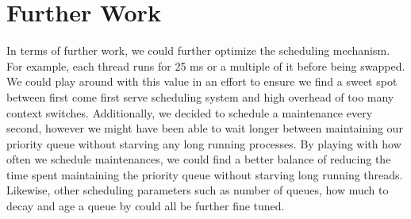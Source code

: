 \documentclass{article}
\begin{document}
\section{Further Work}
In terms of further work, we could further optimize the scheduling mechanism. For example, each thread runs for 25 ms or a multiple of it before being swapped. We could play around with this value in an effort to ensure we find a sweet spot between first come first serve scheduling system and high overhead of too many context switches. Additionally, we decided to schedule a maintenance every second, however we might have been able to wait longer between maintaining our priority queue without starving any long running processes. By playing with how often we schedule maintenances, we could find a better balance of reducing the time spent maintaining the priority queue without starving long running threads. Likewise, other scheduling parameters such as number of queues, how much to decay and age a queue by could all be further fine tuned.
\end{document}
